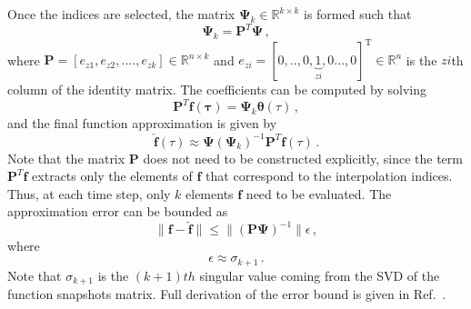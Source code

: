 \documentclass[]{interact}
\theoremstyle{plain}%
\theoremstyle{definition}
\theoremstyle{remark}
\begin{document}
Once the indices are selected, the matrix $\mathbf{\Psi}_k \in \mathbb{R}^{k\times k}$ is formed such that
\begin{equation}
	\mathbf{\Psi}_k = \mathbf{P}^T\mathbf{\Psi}\, ,
\end{equation}
where $\mathbf{P} = [e_{z1}, e_{z2}, ....,e_{zk}] \in \mathbb{R}^{n\times k}$ and $e_{zi} = [0,.., 0, \underbrace{1}_{{zi}}, 0..., 0]^\text{T} \in \mathbb{R}^{n}$
is the  ${zi}$th column of the identity matrix.
The coefficients can be computed by solving
\begin{equation}
	\mathbf{P}^T\mathbf{f(\tau)}=\mathbf{\Psi}_k \boldsymbol{\theta}(\tau)\, ,
	\label{eq:DEIM coefficients}
\end{equation}
and the final function approximation is given by
\begin{equation}
	\hat{\mathbf{f}}(\tau)\approx\mathbf{\Psi}( \mathbf{\Psi}_k)^{-1}\mathbf{P}^T\mathbf{f} (\tau)\, .
\end{equation}
Note that the matrix $\mathbf{P}$ does not need to be constructed explicitly, since the term $\mathbf{P}^T\mathbf{f}$ extracts only the elements of $\mathbf{f}$ that correspond to the interpolation indices.
Thus, at each time step, only $k$ elements $\mathbf{f}$ need to be evaluated.
The approximation error can be bounded as 
\begin{equation}
	\|\mathbf{f} - \hat{\mathbf{f}} \| \le \|(\mathbf{P}\mathbf{\Psi})^{-1} \| \epsilon \, ,
\end{equation}
where
\begin{equation*}
	\epsilon \approx \sigma_{k+1} \, .
\end{equation*}
Note that $\sigma_{k+1}$ is the $(k+1)th$ singular value coming from the SVD of the function snapshots matrix.
Full derivation of the error bound is given in Ref.~\cite{chaturantabut2010nonlinear}.
\end{document}
